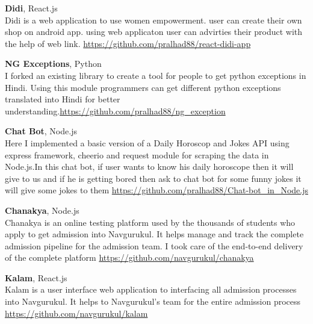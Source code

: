 \documentclass[margin,line]{resume}
\begin{document}
\begin{resume}
    \textbf{Didi}, React.js
    \\ Didi is a web application to use women empowerment. user can create their own shop on android app. using web applicaton user can advirties their product with the help of web link. \url{https://github.com/pralhad88/react-didi-app}
    

    \textbf{NG Exceptions}, Python
    \\ I forked an existing library to create a tool for people to get python exceptions in Hindi. Using this module programmers can get different python exceptions translated into Hindi for better understanding.\url{https://github.com/pralhad88/ng_exception}

    \textbf{Chat Bot}, Node.js
    \\ Here I implemented a basic version of a Daily Horoscop and Jokes API using express framework, cheerio and request module for scraping the data in Node.js.In this chat bot, if user wants to know his daily horoscope then it will give to us and if he is getting bored then ask to chat bot for some funny jokes it will give some jokes to them \url{https://github.com/pralhad88/Chat-bot_in_Node.js}

    \textbf{Chanakya}, Node.js
    \\ Chanakya is an online testing platform used by the thousands of students who apply to get admission into Navgurukul. It helps manage and track the complete admission pipeline for the admission team. I took care of the end-to-end delivery of the complete platform \url{https://github.com/navgurukul/chanakya}

    \textbf{Kalam}, React.js
    \\ Kalam is a user interface web application to interfacing all admission processes into Navgurukul. It helps to Navgurukul’s team for the entire admission process \url{https://github.com/navgurukul/kalam}


\end{resume}
\end{document}
